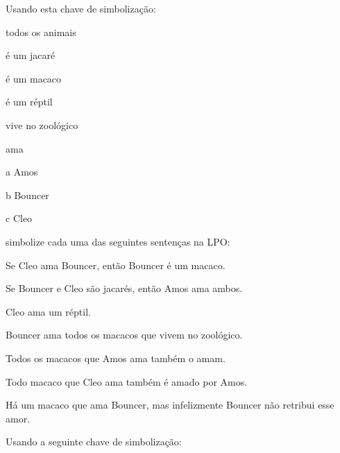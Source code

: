 \practiceproblems
\solutions
\problempart
Usando esta chave de simbolização:
\begin{ekey}
\item[\text{domínio}] todos os animais
\item[\atom{A}{x}]  é um jacaré
\item[\atom{M}{x}]  é um macaco
\item[\atom{R}{x}]  é um réptil
\item[\atom{Z}{x}]  vive no zoológico
\item[\atom{L}{x,y}]  ama 
\item[a] Amos
\item[b] Bouncer
\item[c] Cleo
\end{ekey}
simbolize cada uma das seguintes sentenças na LPO:
\begin{compactlist}
\item Se Cleo ama Bouncer, então Bouncer é um macaco.
\item Se Bouncer e Cleo são jacarés, então Amos ama ambos.
\item Cleo ama um réptil.
\item Bouncer ama todos os macacos que vivem no zoológico.
\item Todos os macacos que Amos ama também o amam.
\item Todo macaco que Cleo ama também é amado por Amos.
\item Há um macaco que ama Bouncer, mas infelizmente Bouncer não retribui esse amor.
\end{compactlist}

\problempart
Usando a seguinte chave de simbolização:

